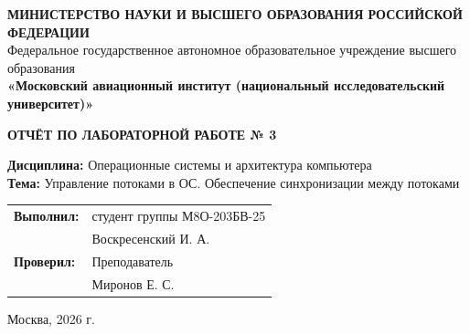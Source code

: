 \documentclass[12pt, a4paper]{article}
\begin{document}
\begin{titlepage}
    \begin{center}
        \Large\textbf{МИНИСТЕРСТВО НАУКИ И ВЫСШЕГО ОБРАЗОВАНИЯ РОССИЙСКОЙ ФЕДЕРАЦИИ} \\
        \vspace{0.3cm}
        \large Федеральное государственное автономное образовательное учреждение высшего образования \\
        \textbf{«Московский авиационный институт (национальный исследовательский университет)»}
    \end{center}

    \vspace{3cm}

    \begin{center}
        \huge\textbf{ОТЧЁТ ПО ЛАБОРАТОРНОЙ РАБОТЕ № 3}
    \end{center}

    \vspace{1.5cm}

    \begin{center}
        \large\textbf{Дисциплина:} Операционные системы и архитектура компьютера \\
        \vspace{0.5cm}
        \large\textbf{Тема:} Управление потоками в ОС. Обеспечение синхронизации между потоками
    \end{center}

    \vspace{3cm}

    \begin{flushright}
        \begin{tabular}{ll}
            \textbf{Выполнил:} & студент группы М8О-203БВ-25 \\
                               & Воскресенский И. А. \\[1cm]
            \textbf{Проверил:} & Преподаватель \\
                               & Миронов Е. С. \\
        \end{tabular}
    \end{flushright}

    \vfill

    \begin{center}
        \large Москва, 2026 г.
    \end{center}
\end{titlepage}

\tableofcontents
\newpage
\end{document}
